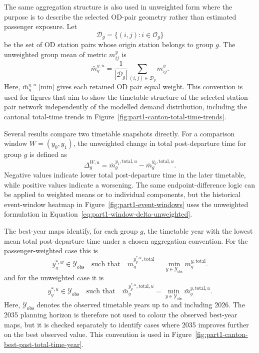 \documentclass[preprint,12pt]{elsarticle}
\begin{document}
The same aggregation structure is also used in unweighted form where the purpose is to describe the selected OD-pair geometry rather than estimated passenger exposure. Let
\[
  \mathcal{D}_g=\{(i,j): i\in\mathcal{O}_g\}
\]
be the set of OD station pairs whose origin station belongs to group $g$. The unweighted group mean of metric $m^y_{ij}$ is
\begin{equation}
  \bar m^{y,u}_g
  =
  \frac{1}{|\mathcal{D}_g|}
  \sum_{(i,j)\in\mathcal{D}_g}
  m^y_{ij}.
  \label{eq:part1-unweighted-group-mean}
\end{equation}
Here, $\bar m^{y,u}_g$ [min] gives each retained OD pair equal weight. This convention is used for figures that aim to show the timetable structure of the selected station-pair network independently of the modelled demand distribution, including the cantonal total-time trends in Figure~\ref{fig:part1-canton-total-time-trends}.

Several results compare two timetable snapshots directly. For a comparison window $W=(y_0,y_1)$, the unweighted change in total post-departure time for group $g$ is defined as
\begin{equation}
  \Delta^{W,u}_{g}
  =
  \bar m^{y_1,\mathrm{total},u}_{g}
  -
  \bar m^{y_0,\mathrm{total},u}_{g}.
  \label{eq:part1-window-delta-unweighted}
\end{equation}
Negative values indicate lower total post-departure time in the later timetable, while positive values indicate a worsening. The same endpoint-difference logic can be applied to weighted means or to individual components, but the historical event-window heatmap in Figure~\ref{fig:part1-event-windows} uses the unweighted formulation in Equation~\eqref{eq:part1-window-delta-unweighted}.

The best-year maps identify, for each group $g$, the timetable year with the lowest mean total post-departure time under a chosen aggregation convention. For the passenger-weighted case this is
\begin{equation}
  y^{*,w}_g \in \mathcal{Y}_{\mathrm{obs}}
  \quad\text{such that}\quad
  \bar m^{y^{*,w}_g,\mathrm{total}}_g
  =
  \min_{y\in\mathcal{Y}_{\mathrm{obs}}}
  \bar m^{y,\mathrm{total}}_g .
  \label{eq:part1-best-year-weighted}
\end{equation}
and for the unweighted case it is
\begin{equation}
  y^{*,u}_g \in \mathcal{Y}_{\mathrm{obs}}
  \quad\text{such that}\quad
  \bar m^{y^{*,u}_g,\mathrm{total},u}_g
  =
  \min_{y\in\mathcal{Y}_{\mathrm{obs}}}
  \bar m^{y,\mathrm{total},u}_g .
  \label{eq:part1-best-year-unweighted}
\end{equation}
Here, $\mathcal{Y}_{\mathrm{obs}}$ denotes the observed timetable years up to and including 2026. The 2035 planning horizon is therefore not used to colour the observed best-year maps, but it is checked separately to identify cases where 2035 improves further on the best observed value. This convention is used in Figure~\ref{fig:part1-canton-best-past-total-time-year}.
\end{document}
